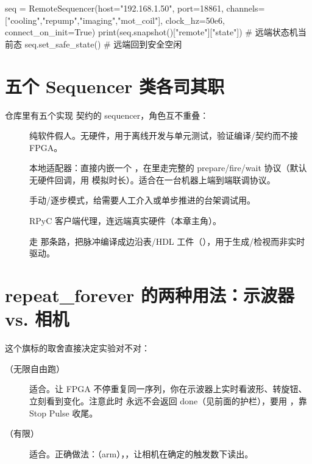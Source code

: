 \documentclass[11pt,oneside,openany]{book}
\begin{document}
\begin{codeblock}[Python]
seq = RemoteSequencer(host="192.168.1.50", port=18861,
                      channels=["cooling","repump","imaging","mot_coil"],
                      clock_hz=50e6, connect_on_init=True)
print(seq.snapshot()["remote"]["state"])   # 远端状态机当前态
seq.set_safe_state()                         # 远端回到安全空闲
\end{codeblock}

\section{五个 Sequencer 类各司其职}

仓库里有五个实现  契约的 sequencer，角色互不重叠：

\begin{description}
\item[] 纯软件假人。无硬件，用于离线开发与单元测试，验证编译/契约而不接 FPGA。
\item[] 本地适配器：直接内嵌一个 ，在里走完整的 prepare/fire/wait 协议（默认无硬件回调，用  模拟时长）。适合在一台机器上端到端联调协议。
\item[] 手动/逐步模式，给需要人工介入或单步推进的台架调试用。
\item[] RPyC 客户端代理，连远端真实硬件（本章主角）。
\item[] 走  那条路，把脉冲编译成边沿表/HDL 工件（），用于生成/检视而非实时驱动。
\end{description}

\section{repeat\_forever 的两种用法：示波器 vs. 相机}

 这个旗标的取舍直接决定实验对不对：

\begin{description}
\item[（无限自由跑）] 适合。让 FPGA 不停重复同一序列，你在示波器上实时看波形、转旋钮、立刻看到变化。注意此时  永远不会返回 done（见前面的护栏），要用 ，靠 Stop Pulse 收尾。
\item[（有限）] 适合。正确做法：（arm），，让相机在确定的触发数下读出。
\end{description}
\end{document}
